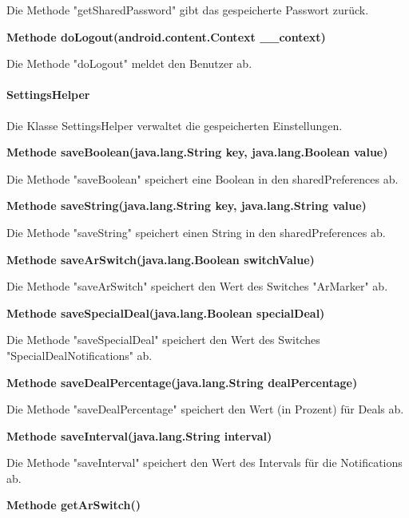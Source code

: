 \documentclass{scrartcl}
\begin{document}
\noindent Die Methode "getSharedPassword" gibt das gespeicherte Passwort zurück. \newline 

\noindent\textbf{Methode doLogout(android.content.Context \_\_context)}

\noindent Die Methode "doLogout" meldet den Benutzer ab. \newline

\paragraph{SettingsHelper}
Die Klasse SettingsHelper verwaltet die gespeicherten Einstellungen. \newline 

\noindent\textbf{Methode saveBoolean(java.lang.String key,                     java.lang.Boolean value)}

\noindent Die Methode "saveBoolean" speichert eine Boolean in den sharedPreferences ab. \newline 

\noindent\textbf{Methode saveString(java.lang.String key, java.lang.String value)}

\noindent Die Methode "saveString" speichert einen String in den sharedPreferences ab. \newline 

\noindent\textbf{Methode saveArSwitch(java.lang.Boolean switchValue)}

\noindent Die Methode "saveArSwitch" speichert den Wert des Switches "ArMarker" ab. \newline

\noindent\textbf{Methode saveSpecialDeal(java.lang.Boolean specialDeal)}

\noindent Die Methode "saveSpecialDeal" speichert den Wert des Switches "SpecialDealNotifications" ab. \newline 

\noindent\textbf{Methode saveDealPercentage(java.lang.String dealPercentage)}

\noindent Die Methode "saveDealPercentage" speichert den Wert (in Prozent) für Deals ab. \newline 

\noindent\textbf{Methode saveInterval(java.lang.String interval)}

\noindent Die Methode "saveInterval" speichert den Wert des Intervals für die Notifications ab. \newline 

\noindent\textbf{Methode getArSwitch()}
\end{document}
